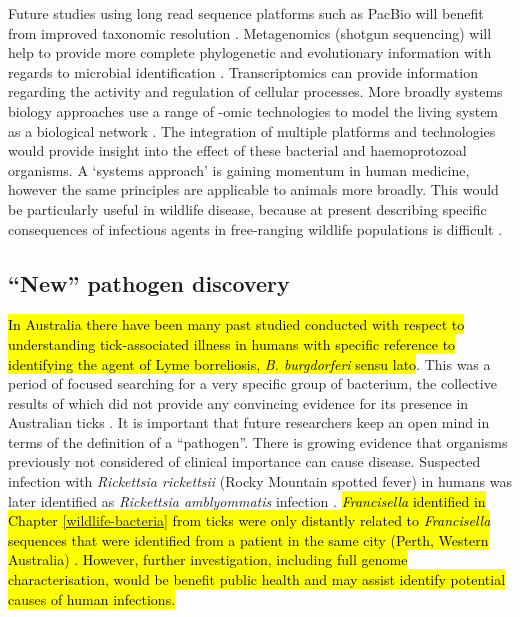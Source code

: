 \documentclass[a4paper, nobind]{templates/ociamthesis}
\begin{document}
Future studies using long read sequence platforms such as PacBio will benefit from improved taxonomic resolution \autocite{jamyLongReadMetabarcoding2020}.
Metagenomics (shotgun sequencing) will help to provide more complete phylogenetic and evolutionary information with regards to microbial identification \autocite{razzautiComparisonTranscriptomeSequencing2015}.
Transcriptomics can provide information regarding the activity and regulation of cellular processes.
More broadly systems biology approaches use a range of -omic technologies to model the living system as a biological network \autocite{eckhardtSystemsApproachInfectious2020}.
The integration of multiple platforms and technologies would provide insight into the effect of these bacterial and haemoprotozoal organisms.
A `systems approach' is gaining momentum in human medicine, however the same principles are applicable to animals more broadly.
This would be particularly useful in wildlife disease, because at present describing specific consequences of infectious agents in free-ranging wildlife populations is difficult \autocite{austenInvestigationMorphologicalDiversity2015,goftonNovelEhrlichiaSpecies2018,northoverIncreasedTrypanosomaSpp2019}.

\hypertarget{new-pathogen-discovery}{%
\subsection{``New'' pathogen discovery}\label{new-pathogen-discovery}}

\hl{In Australia there have been many past studied conducted with respect to understanding tick-associated illness in humans with specific reference to identifying the agent of Lyme borreliosis, \emph{B. burgdorferi} sensu lato}.
This was a period of focused searching for a very specific group of bacterium, the collective results of which did not provide any convincing evidence for its presence in Australian ticks \autocite{chaladaThereLymelikeDisease2016}.
It is important that future researchers keep an open mind in terms of the definition of a ``pathogen''.
There is growing evidence that organisms previously not considered of clinical importance can cause disease.
Suspected infection with \emph{Rickettsia rickettsii} (Rocky Mountain spotted fever) in humans was later identified as \emph{Rickettsia amblyommatis} infection \autocite{appersonTickBorneDiseasesNorth2008}.
\hl{\emph{Francisella} identified in Chapter \ref{wildlife-bacteria} from ticks were only distantly related to \emph{Francisella} sequences that were identified from a patient in the same city (Perth, Western Australia) \autocite{aravena-romanFirstCaseFrancisella2015}. However, further investigation, including full genome characterisation, would be benefit public health and may assist identify potential causes of human infections.}
\end{document}
